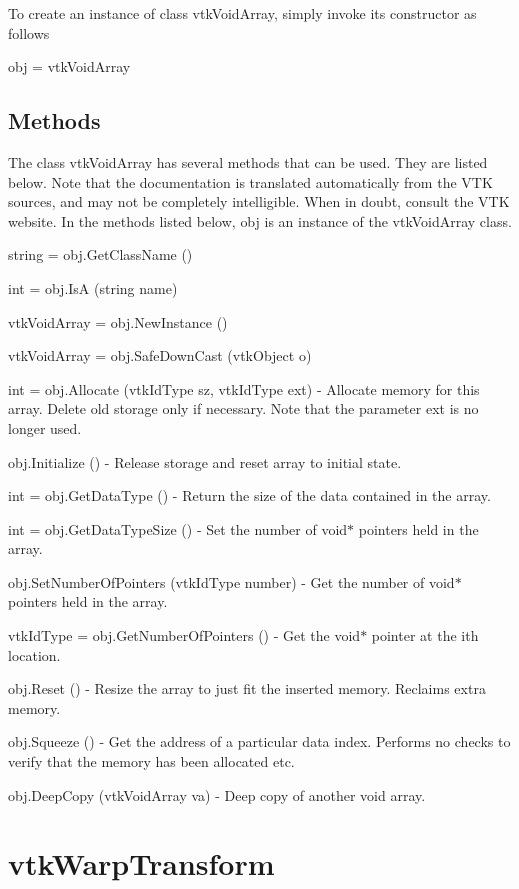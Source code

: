 To create an instance of class vtk\-Void\-Array, simply invoke its constructor as follows \begin{DoxyVerb}  obj = vtkVoidArray
\end{DoxyVerb}
 \hypertarget{vtkwidgets_vtkxyplotwidget_Methods}{}\subsection{Methods}\label{vtkwidgets_vtkxyplotwidget_Methods}
The class vtk\-Void\-Array has several methods that can be used. They are listed below. Note that the documentation is translated automatically from the V\-T\-K sources, and may not be completely intelligible. When in doubt, consult the V\-T\-K website. In the methods listed below, {\ttfamily obj} is an instance of the vtk\-Void\-Array class. 
\begin{DoxyItemize}
\item {\ttfamily string = obj.\-Get\-Class\-Name ()}  
\item {\ttfamily int = obj.\-Is\-A (string name)}  
\item {\ttfamily vtk\-Void\-Array = obj.\-New\-Instance ()}  
\item {\ttfamily vtk\-Void\-Array = obj.\-Safe\-Down\-Cast (vtk\-Object o)}  
\item {\ttfamily int = obj.\-Allocate (vtk\-Id\-Type sz, vtk\-Id\-Type ext)} -\/ Allocate memory for this array. Delete old storage only if necessary. Note that the parameter ext is no longer used.  
\item {\ttfamily obj.\-Initialize ()} -\/ Release storage and reset array to initial state.  
\item {\ttfamily int = obj.\-Get\-Data\-Type ()} -\/ Return the size of the data contained in the array.  
\item {\ttfamily int = obj.\-Get\-Data\-Type\-Size ()} -\/ Set the number of void$\ast$ pointers held in the array.  
\item {\ttfamily obj.\-Set\-Number\-Of\-Pointers (vtk\-Id\-Type number)} -\/ Get the number of void$\ast$ pointers held in the array.  
\item {\ttfamily vtk\-Id\-Type = obj.\-Get\-Number\-Of\-Pointers ()} -\/ Get the void$\ast$ pointer at the ith location.  
\item {\ttfamily obj.\-Reset ()} -\/ Resize the array to just fit the inserted memory. Reclaims extra memory.  
\item {\ttfamily obj.\-Squeeze ()} -\/ Get the address of a particular data index. Performs no checks to verify that the memory has been allocated etc.  
\item {\ttfamily obj.\-Deep\-Copy (vtk\-Void\-Array va)} -\/ Deep copy of another void array.  
\end{DoxyItemize}\hypertarget{vtkcommon_vtkwarptransform}{}\section{vtk\-Warp\-Transform}\label{vtkcommon_vtkwarptransform}
